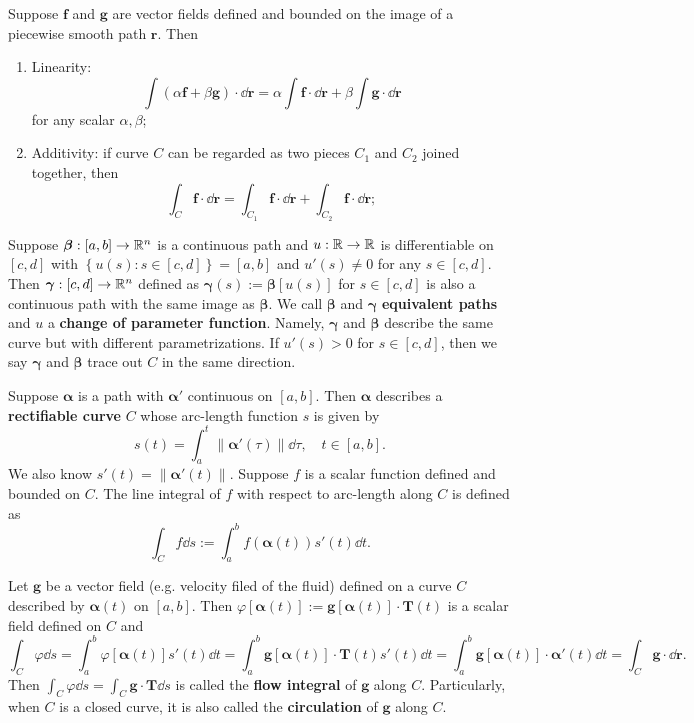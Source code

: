     \begin{theoremenv}
        Suppose $\bm f$ and $\bm g$ are vector fields defined and bounded on the image of a piecewise smooth path $\bm r$. Then
        \begin{enumerate}[label=(\arabic*)]
            \item Linearity: $$ \int (\alpha \bm f + \beta \bm g) \cdot \dd \bm r = \alpha \int \bm f \cdot \dd \bm r + \beta \int \bm g \cdot \dd \bm r$$ for any scalar $\alpha, \beta$;
            \item Additivity: if curve $C$ can be regarded as two pieces $C_1$ and $C_2$ joined together, then $$ \int_C \bm f \cdot \dd \bm r = \int_{C_1} \bm f \cdot \dd \bm r + \int_{C_2} \bm f \cdot \dd \bm r; $$
        \end{enumerate}
    \end{theoremenv}
    \begin{definitionenv}
        Suppose $\bm \beta:[a,b] \to \mathbb{R}^n$ is a continuous path and $u:\mathbb{R} \to \mathbb{R}$ is differentiable on $[c,d]$ with $\left\{ u(s) : s\in [c,d] \right\} = [a,b]$ and $u'(s) \ne 0$ for any $s\in [c,d]$. Then $\bm \gamma: [c,d] \to \mathbb{R}^n$ defined as $\bm \gamma(s) := \bm \beta [u(s)]$ for $s\in [c,d]$ is also a continuous path with the same image as $\bm \beta$. We call $\bm \beta$ and $\bm \gamma$ \textbf{equivalent paths} and $u$ a \textbf{change of parameter function}. Namely, $\bm \gamma$ and $\bm \beta$ describe the same curve but with different parametrizations. If $u'(s) >0$ for $s\in [c,d]$, then we say $\bm \gamma$ and $\bm \beta$ trace out $C$ in the same direction.
    \end{definitionenv}

    \begin{definitionenv}
        Suppose $\bm{\alpha}$ is a path with $\bm{\alpha}'$ continuous on $[a,b]$. Then $\bm{\alpha}$ describes a \textbf{rectifiable curve} $C$ whose arc-length function $s$ is given by
        $$ s(t) = \int_a^t \|\bm{\alpha}'(\tau)\| \dd \tau, \quad t\in [a,b]. $$
        We also know $s'(t) = \|\bm{\alpha}'(t)\|$. Suppose $f$ is a scalar function defined and bounded on $C$. The line integral of $f$ with respect to arc-length along $C$ is defined as
        $$ \int_C f \dd s := \int_a^b f(\bm{\alpha}(t)) s'(t) \dd t. $$ 
    \end{definitionenv}
    \begin{exampleenv}
        Let $\bm g$ be a vector field (e.g. velocity filed of the fluid) defined on a curve $C$ described by $\bm \alpha(t)$ on $[a,b]$. Then $\varphi[\bm \alpha (t)] := \bm g[\bm \alpha(t)] \cdot \bm T(t)$ is a scalar field defined on $C$ and
        $$ \int_C \varphi \dd s = \int_a^b \varphi[\bm \alpha(t)] s'(t) \dd t = \int_a^b \bm g[\bm \alpha(t)] \cdot \bm T(t) s'(t) \dd t = \int_a^b \bm g[\bm \alpha(t)] \cdot \bm \alpha'(t) \dd t = \int_C \bm g \cdot \dd\bm r. $$
        Then $\displaystyle \int_C \varphi \dd s=\int_C \bm g \cdot \bm T \dd s$ is called the \textbf{flow integral} of $\bm g$ along $C$. Particularly, when $C$ is a closed curve, it is also called the \textbf{circulation} of $\bm g$ along $C$.
    \end{exampleenv}

